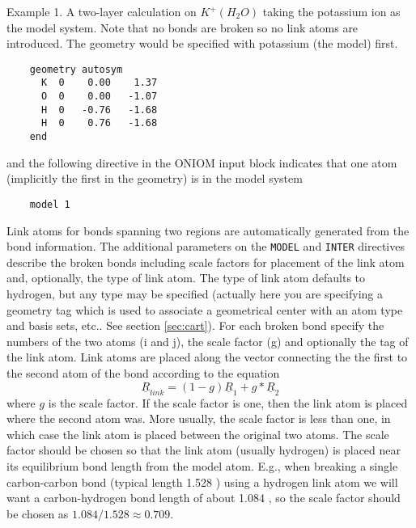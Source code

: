 Example 1.  A two-layer calculation on $K^{+}(H_2O)$ taking the
potassium ion as the model system.  Note that no bonds are broken so
no link atoms are introduced.  The geometry would be specified with
potassium (the model) first.
\begin{verbatim}
    geometry autosym
      K  0    0.00    1.37
      O  0    0.00   -1.07
      H  0   -0.76   -1.68
      H  0    0.76   -1.68
    end
\end{verbatim}
and the following directive in the ONIOM input block indicates that
one atom (implicitly the first in the geometry) is in the model system
\begin{verbatim}
    model 1
\end{verbatim}

Link atoms for bonds spanning two regions are automatically generated
from the bond information.  The additional parameters on the
\verb+MODEL+ and \verb+INTER+ directives describe the broken bonds
including scale factors for placement of the link atom 
and, optionally, the type of link atom.  The type of link atom
defaults to hydrogen, but any type may be specified (actually here you
are specifying a geometry tag which is used to associate a geometrical
center with an atom type and basis sets, etc..  See section
\ref{sec:cart}).
For each broken bond specify the numbers of the two atoms (i and j),
the scale factor (g) and optionally the tag of the link atom.  Link
atoms are placed along the vector connecting the the first to the
second atom of the bond according to the equation
\begin{displaymath}
\underline{R}_{link} = (1-g)\underline{R}_{1} + g*\underline{R}_{2}
\end{displaymath}
where $g$ is the scale factor.  If the scale factor is one, then the
link atom is placed where the second atom was.  More usually, the
scale factor is less than one, in which case the link atom is placed
between the original two atoms.  The scale factor should be chosen so
that the link atom (usually hydrogen) is placed near its equilibrium
bond length from the model atom.  E.g., when breaking a single
carbon-carbon bond (typical length 1.528 {\angstroms}) using a hydrogen
link atom we will want a carbon-hydrogen bond length of about 1.084
{\angstroms}, so the scale factor should be chosen as $1.084/1.528
\approx 0.709$.

